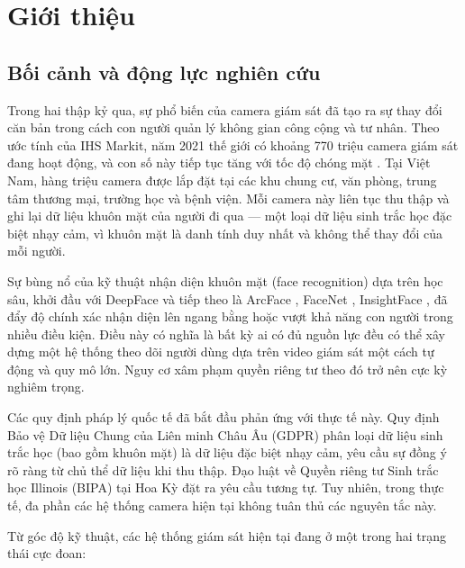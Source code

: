 \section{Giới thiệu}
\label{sec:gioithieu}

\subsection{Bối cảnh và động lực nghiên cứu}
\label{subsec:boidung}

Trong hai thập kỷ qua, sự phổ biến của camera giám sát đã tạo ra sự thay đổi căn bản trong cách con người quản lý không gian công cộng và tư nhân. Theo ước tính của IHS Markit, năm 2021 thế giới có khoảng 770 triệu camera giám sát đang hoạt động, và con số này tiếp tục tăng với tốc độ chóng mặt \cite{ihs2021}. Tại Việt Nam, hàng triệu camera được lắp đặt tại các khu chung cư, văn phòng, trung tâm thương mại, trường học và bệnh viện. Mỗi camera này liên tục thu thập và ghi lại dữ liệu khuôn mặt của người đi qua --- một loại dữ liệu sinh trắc học đặc biệt nhạy cảm, vì khuôn mặt là danh tính duy nhất và không thể thay đổi của mỗi người.

\medskip
Sự bùng nổ của kỹ thuật nhận diện khuôn mặt (face recognition) dựa trên học sâu, khởi đầu với DeepFace \cite{taigman2014} và tiếp theo là ArcFace \cite{deng2019arcface}, FaceNet \cite{schroff2015facenet}, InsightFace \cite{guo2021insightface}, đã đẩy độ chính xác nhận diện lên ngang bằng hoặc vượt khả năng con người trong nhiều điều kiện. Điều này có nghĩa là bất kỳ ai có đủ nguồn lực đều có thể xây dựng một hệ thống theo dõi người dùng dựa trên video giám sát một cách tự động và quy mô lớn. Nguy cơ xâm phạm quyền riêng tư theo đó trở nên cực kỳ nghiêm trọng.

\medskip
Các quy định pháp lý quốc tế đã bắt đầu phản ứng với thực tế này. Quy định Bảo vệ Dữ liệu Chung của Liên minh Châu Âu (GDPR) \cite{gdpr2016} phân loại dữ liệu sinh trắc học (bao gồm khuôn mặt) là dữ liệu đặc biệt nhạy cảm, yêu cầu sự đồng ý rõ ràng từ chủ thể dữ liệu khi thu thập. Đạo luật về Quyền riêng tư Sinh trắc học Illinois (BIPA) tại Hoa Kỳ \cite{bipa2008} đặt ra yêu cầu tương tự. Tuy nhiên, trong thực tế, đa phần các hệ thống camera hiện tại không tuân thủ các nguyên tắc này.

\medskip
Từ góc độ kỹ thuật, các hệ thống giám sát hiện tại đang ở một trong hai trạng thái cực đoan:

